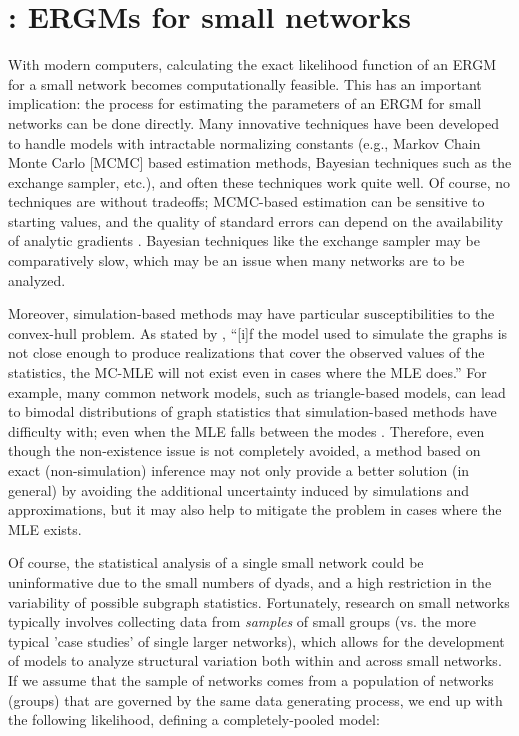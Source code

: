 \documentclass[review, nonatbib,doubleblind]{elsarticle/elsarticle}
\begin{document}
\section{\ergmitos{}: ERGMs for small networks}

With modern computers, calculating the exact likelihood function of an ERGM for a small network becomes computationally feasible. This has an important implication: the process for estimating the parameters of an ERGM for small networks can be done directly. Many innovative techniques have been developed to handle models with intractable normalizing constants (e.g., Markov Chain Monte Carlo [MCMC] based estimation methods, Bayesian techniques such as the exchange sampler, etc.), and often these techniques work quite well. Of course, no techniques are without tradeoffs; MCMC-based estimation can be sensitive to starting values, and the quality of standard errors can depend on the availability of analytic gradients \cite{Park2018}. Bayesian techniques like the exchange sampler \cite{Moller2006} may be comparatively slow, which may be an issue when many networks are to be analyzed.

Moreover, simulation-based methods may have particular susceptibilities to the convex-hull problem. As stated by \cite[p. 7]{Handcock2003}, ``[i]f the model used to simulate the graphs is not close enough to produce realizations that cover the observed values of the statistics, the MC-MLE will not exist even in cases where the MLE does.'' For example, many common network models, such as triangle-based models, can lead to bimodal distributions of graph statistics that simulation-based methods have difficulty with; even when the MLE falls between the modes \cite{Hunteretal2012}. Therefore, even though the non-existence issue is not completely avoided, a method based on exact (non-simulation) inference may not only provide a better solution (in general) by avoiding the additional uncertainty induced by simulations and approximations, but it may also help to mitigate the problem in cases where the MLE exists.

Of course, the statistical analysis of a single small network could be uninformative due to the small numbers of dyads, and a high restriction in the variability of possible subgraph statistics. Fortunately, research on small networks typically involves collecting data from \textit{samples} of small groups (vs. the more typical 'case studies' of single larger networks), which allows for the development of models to analyze structural variation both within and across small networks. If we assume that the sample of networks comes from a population of networks (groups) that are governed by the same data generating process, we end up with the following likelihood, defining a completely-pooled model:
\end{document}
